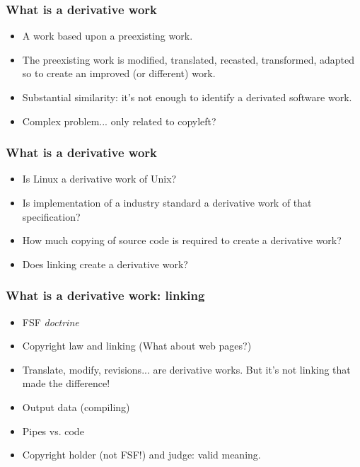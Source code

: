 
\begin{frame}
\frametitle{What is a derivative work}

\begin{itemize}
\item A work based upon a preexisting work.
\item The preexisting work is modified, translated, recasted, 
transformed, adapted so to create an improved (or different) work.
\item \alert{Substantial similarity}: it's not enough to identify a derivated software work. 
\item Complex problem... only related to copyleft?
\end{itemize}
\end{frame}


\begin{frame}
\frametitle{What is a derivative work}

\begin{itemize}
\item  Is Linux a derivative work of Unix?
\item Is implementation of a industry standard a derivative work of that specification?
\item How much copying of source code is required to create a derivative work?
\item Does linking create a derivative work?
\end{itemize}
\end{frame}



\begin{frame}
\frametitle{What is a derivative work: linking}

\begin{itemize}
\item FSF \textit{doctrine}
\item Copyright law and linking (What about web pages?)
\item Translate, modify, revisions... are derivative works. But it's not linking that made the difference!
\item Output data (compiling)
\item Pipes vs. code
\item Copyright holder (not FSF!) and judge: valid meaning. 
\end{itemize}
\end{frame}



